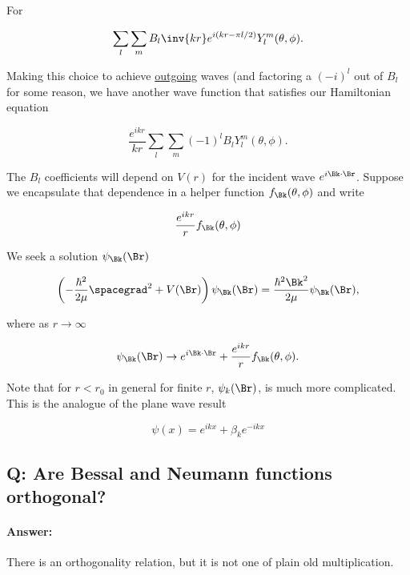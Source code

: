 For 

\begin{equation}\label{eqn:qmTwoL23:540}
\sum_l 
\sum_m B_l
\inv{k r} e^{i (k r - \pi l/2)} Y_l^m(\theta, \phi).
\end{equation}

Making this choice to achieve \underline{outgoing} waves (and factoring a $(-i)^l$ out of $B_l$ for some reason, we have another wave function that satisfies our Hamiltonian equation

\begin{equation}\label{eqn:qmTwoL23:560}
\frac{e^{i k r}}{k r} 
\sum_l 
\sum_m 
(-1)^l
B_l
Y_l^m(\theta, \phi).
\end{equation}

The $B_l$ coefficients will depend on $V(r)$ for the incident wave $e^{i \Bk \cdot \Br}$.  Suppose we encapsulate that dependence in a helper function $f_\Bk(\theta, \phi)$ and write

\begin{equation}\label{eqn:qmTwoL23:580}
\frac{e^{i k r}}{r} f_\Bk(\theta, \phi)
\end{equation}

We seek a solution $\psi_\Bk(\Br)$ 

\begin{equation}\label{eqn:qmTwoL23:60b}
\left( - \frac{\hbar^2}{2\mu} \spacegrad^2 
+ V(\Br)
\right)
\psi_\Bk(\Br)
 = \frac{\hbar^2 \Bk^2}{2 \mu} 
\psi_\Bk(\Br),
\end{equation}

where as $r \rightarrow \infty$ 

\begin{equation}\label{eqn:qmTwoL23:600}
\psi_\Bk(\Br) \rightarrow e^{i \Bk \cdot \Br} + \frac{e^{i k r}}{r} f_\Bk(\theta, \phi).
\end{equation}

Note that for $r < r_0$ in general for finite $r$, $\psi_k(\Br)$, is much more complicated.  This is the analogue of the plane wave result

\begin{equation}\label{eqn:qmTwoL23:620}
\psi(x) = e^{i k x} + \beta_k e^{-i k x}
\end{equation}

\subsection{Q: Are Bessal and Neumann functions orthogonal?}

\paragraph{Answer:} There is an orthogonality relation, but it is not one of plain old multiplication.

